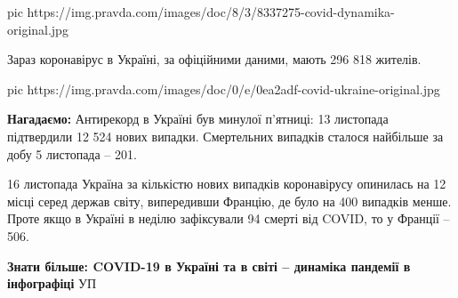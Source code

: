 \ifcmt
pic https://img.pravda.com/images/doc/8/3/8337275-covid-dynamika-original.jpg
\fi

Зараз коронавірус в Україні, за офіційними даними, мають 296 818 жителів.

\ifcmt
pic https://img.pravda.com/images/doc/0/e/0ea2adf-covid-ukraine-original.jpg
\fi

\textbf{Нагадаємо:} Антирекорд в Україні був минулої п'ятниці: 13 листопада
підтвердили 12 524 нових випадки. Смертельних випадків сталося найбільше за
добу 5 листопада – 201.

16 листопада Україна за кількістю нових випадків коронавірусу опинилась на 12
місці серед держав
світу, випередивши
Францію, де було на 400 випадків менше.  Проте якщо в Україні в неділю
зафіксували 94 смерті від COVID, то у Франції – 506.

\textbf{Знати більше: COVID-19 в Україні та в світі – динаміка пандемії в інфографіці}
УП
